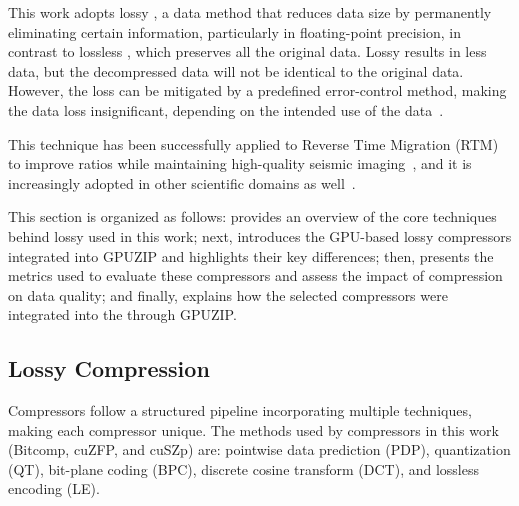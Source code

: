 \documentclass[Ingles]{ic-tese-v3}
\begin{document}
This work adopts lossy \compression, a data \compression method that reduces data size by permanently eliminating certain information, particularly in floating-point precision, in contrast to lossless \compression, which preserves all the original data. Lossy \compression results in less data, but the decompressed data will not be identical to the original data. However, the loss can be mitigated by a predefined error-control method, making the data loss insignificant, depending on the intended use of the data~\cite{di2025}. 

This technique has been successfully applied to Reverse Time Migration (RTM) to improve \compression ratios while maintaining high-quality seismic imaging~\cite{kukreja2020, di2025, barbosa2023}, and it is increasingly adopted in other scientific domains as well~\cite{liu2022,di2025}.

This section is organized as follows:  provides an overview of the core techniques behind lossy \compression used in this work; next,  introduces the GPU-based lossy compressors integrated into GPUZIP and highlights their key differences; then,  presents the metrics used to evaluate these compressors and assess the impact of compression on data quality; and finally,  explains how the selected compressors were integrated into the \awave through GPUZIP.

\subsection{Lossy Compression}
\label{sec:lossy}

Compressors follow a structured \compression pipeline incorporating multiple techniques, making each compressor unique. The methods used by compressors in this work (Bitcomp, cuZFP, and cuSZp) are: pointwise data prediction (PDP), quantization (QT), bit-plane coding (BPC), discrete cosine transform (DCT), and lossless encoding (LE)\cite{di2025}.

\end{document}
